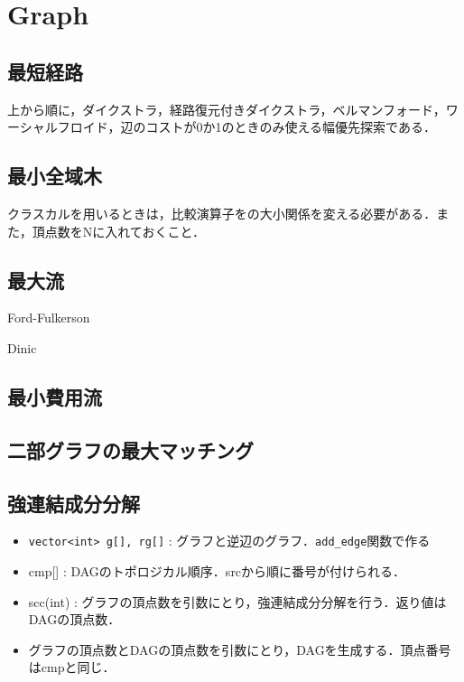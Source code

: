 \section{Graph}

\subsection{最短経路}
上から順に，ダイクストラ，経路復元付きダイクストラ，ベルマンフォード，ワーシャルフロイド，辺のコストが0か1のときのみ使える幅優先探索である．


\subsection{最小全域木}
クラスカルを用いるときは，比較演算子をの大小関係を変える必要がある．また，頂点数をNに入れておくこと．


\subsection{最大流}
Ford-Fulkerson

Dinic


\subsection{最小費用流}


\subsection{二部グラフの最大マッチング}


\subsection{強連結成分分解}
\begin{itemize}
  \item \verb#vector<int> g[], rg[]# : グラフと逆辺のグラフ．\verb#add_edge#関数で作る
  \item cmp[] : DAGのトポロジカル順序．srcから順に番号が付けられる．
  \item scc(int) : グラフの頂点数を引数にとり，強連結成分分解を行う．返り値はDAGの頂点数．
  \item グラフの頂点数とDAGの頂点数を引数にとり，DAGを生成する．頂点番号はcmpと同じ．
\end{itemize}


